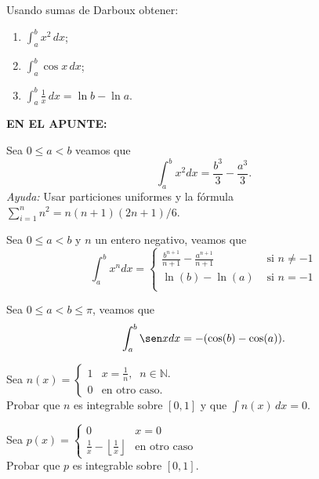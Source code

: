 \documentclass{book}
\newcommand{\nn}{\mathbb{N}}
\begin{document}
\begin{ejer}{} Usando sumas de Darboux obtener:
\begin{enumerate}
\item $\int_a^b x^2\,dx$;
\item $\int_a^b \cos x\,dx$;
\item $\int_a^b \frac{1}{x}\,dx=\ln b- \ln a$.
\end{enumerate}
\end{ejer}  

\textbf{EN EL APUNTE: }



\begin{ejer}{} 
Sea $0\leq a<b$ veamos que 
\[
 \int_a^b x^2 dx=\frac{b^3}{3}-\frac{a^3}{3}.
\]
{\em Ayuda:} Usar particiones uniformes y la fórmula $\sum\limits_{i=1}^nn^2= n(n+1)(2n+1)/6$.


\end{ejer}  

\begin{ejer}{} 
Sea $0\leq a<b$ y $n$ un entero negativo, veamos que
\[
 \int_a^b x^n dx=
 \begin{cases}
\frac{b^{n+1}}{n+1}-
\frac{a^{n+1}}{n+1} & \text{ si } n\neq -1\\
 \ln(b)-\ln(a) & \text{ si } n=-1\\
\end{cases}
\]

\end{ejer} 

\begin{ejer}{} 
 Sea $0\leq a<b\leq \pi$, veamos que
\[
 \int_a^b \sen x dx=-(\cos(b)-\cos(a)).
\]


\end{ejer} 

\begin{ejer}{} 
Sea $n(x)=\left
\{
\begin {array}{ll}
1&x=\frac{1}{n},\;\;n\in \nn.\\
0&\mbox{en otro caso.}
\end{array}
\right.$
\\
Probar que $n$ es integrable sobre $[0,1]$ y que $\int n(x)\,dx=0$.


\end{ejer}

\begin{ejer}{} 
Sea $p(x)=\left
\{
\begin {array}{ll}
0&x=0\\
\frac{1}{x}-\left\lfloor \frac{1}{x}\right\rfloor&\mbox{en otro caso}
\end{array}
\right.$
\\
Probar que $p$ es integrable sobre $[0,1]$.


\end{ejer} 
\end{document}
